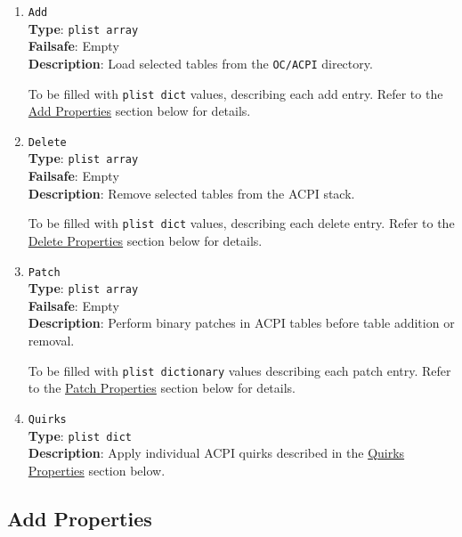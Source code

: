 \documentclass[]{article}
\makeatletter
\renewcommand{\label}[1]{%
\zref@wrapper@immediate{\oldlabel{#1}}}  %
\makeatother
\begin{document}
\begin{enumerate}
\item
  \texttt{Add}\\
  \textbf{Type}: \texttt{plist\ array}\\
  \textbf{Failsafe}: Empty\\
  \textbf{Description}: Load selected tables from the \texttt{OC/ACPI}
  directory.

  To be filled with \texttt{plist\ dict} values, describing each add entry.
  Refer to the \hyperref[acpipropsadd]{Add Properties} section below for details.

\item
  \texttt{Delete}\\
  \textbf{Type}: \texttt{plist\ array}\\
  \textbf{Failsafe}: Empty\\
  \textbf{Description}: Remove selected tables from the ACPI stack.

  To be filled with \texttt{plist\ dict} values, describing each delete entry.
  Refer to the \hyperref[acpipropsdelete]{Delete Properties} section below for details.

\item
  \texttt{Patch}\\
  \textbf{Type}: \texttt{plist\ array}\\
  \textbf{Failsafe}: Empty\\
  \textbf{Description}: Perform binary patches in ACPI tables before
  table addition or removal.

  To be filled with \texttt{plist\ dictionary} values describing each patch entry.
  Refer to the \hyperref[acpipropspatch]{Patch Properties} section below for details.

\item
  \texttt{Quirks}\\
  \textbf{Type}: \texttt{plist\ dict}\\
  \textbf{Description}: Apply individual ACPI quirks described
  in the \hyperref[acpipropsquirks]{Quirks Properties} section below.

\end{enumerate}

\subsection{Add Properties}\label{acpipropsadd}
\end{document}
